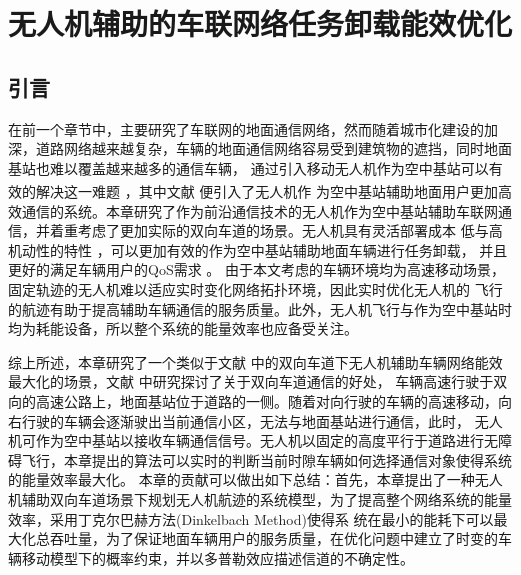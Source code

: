 \chapter{无人机辅助的车联网络任务卸载能效优化} \label{chap:table第四章}
\section{引言} \label{section4-1}
在前一个章节中，主要研究了车联网的地面通信网络，然而随着城市化建设的加深，道路网络越来越复杂，车辆的地面通信网络容易受到建筑物的遮挡，同时地面基站也难以覆盖越来越多的通信车辆，
通过引入移动无人机作为空中基站可以有效的解决这一难题  \textsuperscript{\cite{Effect2020,Performance2022}}，其中文献 \cite{WirelessRelay5937283} 便引入了无人机作
为空中基站辅助地面用户更加高效通信的系统。本章研究了作为前沿通信技术的无人机作为空中基站辅助车联网通信，并着重考虑了更加实际的双向车道的场景。无人机具有灵活部署成本
低与高机动性的特性  \supercite{无人机技术辅助的车联网,王智煊2023无人机辅助下的车联边缘计算卸载机制研究,Joint9453853}，可以更加有效的作为空中基站辅助地面车辆进行任务卸载，
并且更好的满足车辆用户的QoS需求 \supercite{无人机QoS9373692}。 由于本文考虑的车辆环境均为高速移动场景，固定轨迹的无人机难以适应实时变化网络拓扑环境，因此实时优化无人机的
飞行的航迹有助于提高辅助车辆通信的服务质量。此外，无人机飞行与作为空中基站时均为耗能设备，所以整个系统的能量效率也应备受关注。

综上所述，本章研究了一个类似于文献 \cite{twoway7091030} 中的双向车道下无人机辅助车辆网络能效最大化的场景，文献 \cite{twoway5753961,twoway575396233,Spatial4490168,Stochastic6576809} 中研究探讨了关于双向车道通信的好处，
车辆高速行驶于双向的高速公路上，地面基站位于道路的一侧。随着对向行驶的车辆的高速移动，向右行驶的车辆会逐渐驶出当前通信小区，无法与地面基站进行通信，此时，
无人机可作为空中基站以接收车辆通信信号。无人机以固定的高度平行于道路进行无障碍飞行，本章提出的算法可以实时的判断当前时隙车辆如何选择通信对象使得系统的能量效率最大化。
本章的贡献可以做出如下总结：首先，本章提出了一种无人机辅助双向车道场景下规划无人机航迹的系统模型，为了提高整个网络系统的能量效率，采用丁克尔巴赫方法(Dinkelbach Method)使得系
统在最小的能耗下可以最大化总吞吐量，为了保证地面车辆用户的服务质量，在优化问题中建立了时变的车辆移动模型下的概率约束，并以多普勒效应描述信道的不确定性。
